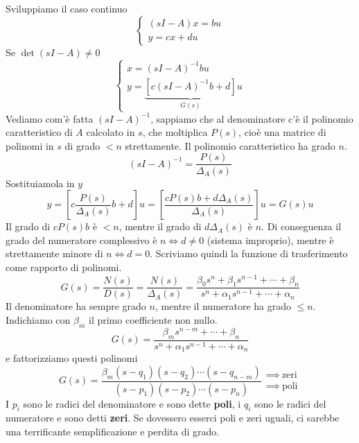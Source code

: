 Sviluppiamo il caso continuo
\begin{equation*}
	\begin{cases}
		(sI-A)x=bu \\
		y=cx+du    
	\end{cases}
\end{equation*}
Se $\det(sI-A) \neq 0$
\begin{equation*}
	\begin{cases}
		x=(sI-A)^{-1} bu                                       \\
		y=\underbrace{\left[ c(sI-A)^{-1} b+d\right]}_{G(s)} u 
	\end{cases}
\end{equation*}
Vediamo com'è fatta $(sI-A)^{-1}$, sappiamo che al denominatore c'è il polinomio caratteristico di $A$ calcolato in $s$, che moltiplica $P(s)$, cioè una matrice di polinomi in $s$ di grado $< n$ strettamente. Il polinomio caratteristico ha grado $n$.
\begin{equation*}
	(sI-A)^{-1} =\frac{P(s)}{\Delta _A(s)}
\end{equation*}
Sostituiamola in $y$
\begin{equation*}
	y=\left[ c\frac{P(s)}{\Delta _A(s)} b+d\right] u=\left[\frac{cP(s) b+d\Delta _A(s)}{\Delta _A(s)}\right] u=G(s) u
\end{equation*}
Il grado di $cP(s) b$ è $< n$, mentre il grado di $d\Delta _A(s)$ è $n$. Di conseguenza il grado del numeratore complessivo è $n\iff d\neq 0$ (sistema improprio), mentre è strettamente minore di $n\iff d=0$. Scriviamo quindi la funzione di trasferimento come rapporto di polinomi.
\begin{equation*}
	G(s) =\frac{N(s)}{D(s)} =\frac{N(s)}{\Delta _A(s)} =\frac{\beta _0 s^n +\beta _1 s^{n-1} +\cdots +\beta _n}{s^n +\alpha _1 s^{n-1} +\cdots +\alpha _n}
\end{equation*}
Il denominatore ha sempre grado $n$, mentre il numeratore ha grado $\leq n$. Indichiamo con $\beta _m$ il primo coefficiente non nullo.
\begin{equation*}
	G(s) =\frac{\beta _m s^{n-m} +\cdots +\beta _n}{s^n +\alpha _1 s^{n-1} +\cdots +\alpha _n}
\end{equation*}
e fattorizziamo questi polinomi
\begin{equation}
	G(s) =\frac{\beta _m(s-q_1)(s-q_2) \cdots (s-q_{n-m})}{(s-p_1)(s-p_2) \cdots (s-p_n)}\begin{array}{ l }
	\implies \ \text{zeri}\\
	\implies \ \text{poli}
	\end{array}
\end{equation}
I $p_i$ sono le radici del denominatore e sono dette \textbf{poli}, i $q_i$ sono le radici del numeratore e sono detti \textbf{zeri}. Se dovessero esserci poli e zeri uguali, ci sarebbe una terrificante semplificazione e perdita di grado.


